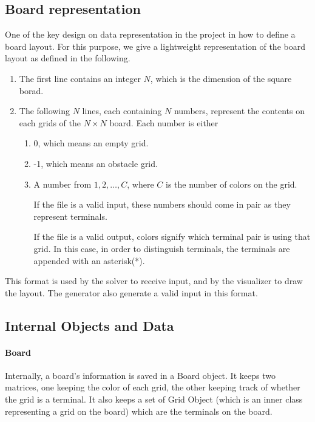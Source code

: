 \documentclass{article}
\begin{document}
\begin{spacing}{1.1}
    \subsection{Board representation}
    \label{DAT:BOARD}
    One of the key design on data representation in the project in how to define a board layout. For this purpose, we give a lightweight representation of the board layout as defined in the following.
    \begin{enumerate}[label = \arabic*. ]
        \item The first line contains an integer $N$, which is the dimension of the square borad.
        \item The following $N$ lines, each containing $N$ numbers, represent the contents on each grids of the $N \times N$ board. Each number is either
        \begin{enumerate}[label = \alph*)]
            \item 0, which means an empty grid.
            \item -1, which means an obstacle grid.
            \item A number from $1, 2, \ldots, C$, where $C$ is the number of colors on the grid.

            If the file is a valid input, these numbers should come in pair as they represent terminals.

            If the file is a valid output, colors signify which terminal pair is using that grid. In this case, in order to distinguish terminals, the terminals
            are appended with an asterisk(*).
        \end{enumerate}
    \end{enumerate}
    This format is used by the solver to receive input, and by the visualizer to draw the layout. The generator also generate a valid input in this format.
    \subsection{Internal Objects and Data}
    \paragraph{Board}
    Internally, a board's information is saved in a Board object. It keeps two matrices, one keeping the color of each grid, the other keeping track of whether the grid is a terminal. It also keeps a set of Grid Object (which is
    an inner class representing a grid on the board) which are the terminals on the board.


\end{spacing}
\end{document}
